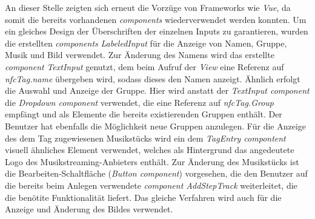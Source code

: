 \documentclass[10pt, a4paper]{article}
\begin{document}
\begin{onehalfspace}
An dieser Stelle zeigten sich erneut die Vorzüge von Frameworks wie \textit{Vue}, da somit die bereits vorhandenen \textit{components} wiederverwendet werden konnten.
Um ein gleiches Design der Überschriften der einzelnen Inputs zu garantieren, wurden die erstellten \textit{components} \textit{LabeledInput} für die Anzeige von Namen, Gruppe, Musik und Bild verwendet.
Zur Änderung des Namens wird das erstellte \textit{component} \textit{TextInput} genutzt, dem beim Aufruf der \textit{View} eine Referenz auf \textit{nfcTag.name} übergeben wird, sodass dieses den Namen anzeigt.
Ähnlich erfolgt die Auswahl und Anzeige der Gruppe. Hier wird anstatt der \textit{TextInput component} die \textit{Dropdown component} verwendet, die eine Referenz auf \textit{nfcTag.Group} empfängt und als Elemente die bereits existierenden Gruppen enthält.
Der Benutzer hat ebenfalls die Möglichkeit neue Gruppen anzulegen.
Für die Anzeige des dem Tag zugewiesenen Musikstücks wird ein dem \textit{TagEntry compontent} visuell ähnliches Element verwendet, welches als Hintergrund das angedeutete Logo des Musikstreaming-Anbieters enthält.
Zur Änderung des Musikstücks ist die Bearbeiten-Schaltfläche (\textit{Button component}) vorgesehen, die den Benutzer auf die bereits beim Anlegen verwendete \textit{component AddStepTrack} weiterleitet, die die benötite Funktionalität liefert.
Das gleiche Verfahren wird auch für die Anzeige und Änderung des Bildes verwendet.



\end{onehalfspace}
\end{document}
